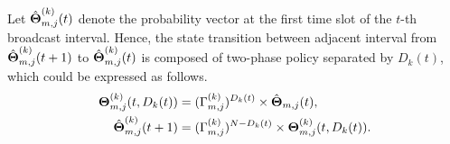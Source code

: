 \begin{definition}
    Let $\hat{\boldsymbol{\Theta}}^{(k)}_{m,j}(t)$ denote the probability vector at the first time slot of the $t$-th broadcast interval.
    Hence, the state transition between adjacent interval from $\hat{\boldsymbol{\Theta}}^{(k)}_{m,j}(t+1)$ to $\hat{\boldsymbol{\Theta}}^{(k)}_{m,j}(t)$ is composed of two-phase policy separated by $D_k(t)$, which could be expressed as follows.
    \begin{align}
        \boldsymbol{\Theta}^{(k)}_{m,j}(t, D_{k}(t)) &= (\Gamma^{(k)}_{m,j})^{D_{k}(t)} \times \hat{\boldsymbol{\Theta}}_{m,j}(t),
        \nonumber\\
        \hat{\boldsymbol{\Theta}}^{(k)}_{m,j}(t+1) &= (\Gamma^{(k)}_{m,j})^{N-D_{k}(t)} \times \boldsymbol{\Theta}^{(k)}_{m,j}(t, D_{k}(t)).
    \end{align}
\end{definition}

